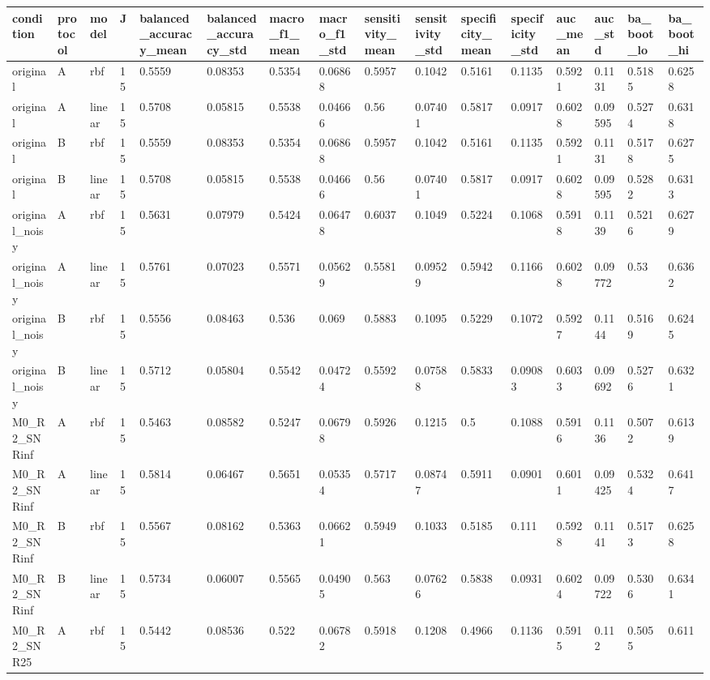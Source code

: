 \begin{tabular}{llllllllllllllll}
\hline
condition & protocol & model & J & balanced\_accuracy\_mean & balanced\_accuracy\_std & macro\_f1\_mean & macro\_f1\_std & sensitivity\_mean & sensitivity\_std & specificity\_mean & specificity\_std & auc\_mean & auc\_std & ba\_boot\_lo & ba\_boot\_hi \\
\hline
original & A & rbf & 15 & 0.5559 & 0.08353 & 0.5354 & 0.06868 & 0.5957 & 0.1042 & 0.5161 & 0.1135 & 0.5921 & 0.1131 & 0.5185 & 0.6258 \\
original & A & linear & 15 & 0.5708 & 0.05815 & 0.5538 & 0.04666 & 0.56 & 0.07401 & 0.5817 & 0.0917 & 0.6028 & 0.09595 & 0.5274 & 0.6318 \\
original & B & rbf & 15 & 0.5559 & 0.08353 & 0.5354 & 0.06868 & 0.5957 & 0.1042 & 0.5161 & 0.1135 & 0.5921 & 0.1131 & 0.5178 & 0.6275 \\
original & B & linear & 15 & 0.5708 & 0.05815 & 0.5538 & 0.04666 & 0.56 & 0.07401 & 0.5817 & 0.0917 & 0.6028 & 0.09595 & 0.5282 & 0.6313 \\
original\_noisy & A & rbf & 15 & 0.5631 & 0.07979 & 0.5424 & 0.06478 & 0.6037 & 0.1049 & 0.5224 & 0.1068 & 0.5918 & 0.1139 & 0.5216 & 0.6279 \\
original\_noisy & A & linear & 15 & 0.5761 & 0.07023 & 0.5571 & 0.05629 & 0.5581 & 0.09529 & 0.5942 & 0.1166 & 0.6028 & 0.09772 & 0.53 & 0.6362 \\
original\_noisy & B & rbf & 15 & 0.5556 & 0.08463 & 0.536 & 0.069 & 0.5883 & 0.1095 & 0.5229 & 0.1072 & 0.5927 & 0.1144 & 0.5169 & 0.6245 \\
original\_noisy & B & linear & 15 & 0.5712 & 0.05804 & 0.5542 & 0.04724 & 0.5592 & 0.07588 & 0.5833 & 0.09083 & 0.6033 & 0.09692 & 0.5276 & 0.6321 \\
M0\_R2\_SNRinf & A & rbf & 15 & 0.5463 & 0.08582 & 0.5247 & 0.06798 & 0.5926 & 0.1215 & 0.5 & 0.1088 & 0.5916 & 0.1136 & 0.5072 & 0.6139 \\
M0\_R2\_SNRinf & A & linear & 15 & 0.5814 & 0.06467 & 0.5651 & 0.05354 & 0.5717 & 0.08747 & 0.5911 & 0.0901 & 0.6011 & 0.09425 & 0.5324 & 0.6417 \\
M0\_R2\_SNRinf & B & rbf & 15 & 0.5567 & 0.08162 & 0.5363 & 0.06621 & 0.5949 & 0.1033 & 0.5185 & 0.111 & 0.5928 & 0.1141 & 0.5173 & 0.6258 \\
M0\_R2\_SNRinf & B & linear & 15 & 0.5734 & 0.06007 & 0.5565 & 0.04905 & 0.563 & 0.07626 & 0.5838 & 0.0931 & 0.6024 & 0.09722 & 0.5306 & 0.6341 \\
M0\_R2\_SNR25 & A & rbf & 15 & 0.5442 & 0.08536 & 0.522 & 0.06782 & 0.5918 & 0.1208 & 0.4966 & 0.1136 & 0.5915 & 0.112 & 0.5055 & 0.611 \\

\end{tabular}
